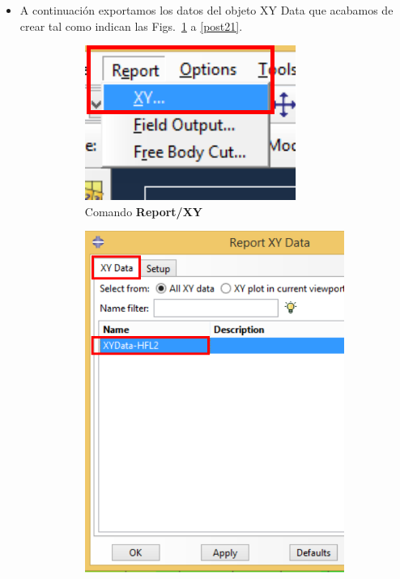 \begin{itemize}
\item A continuación exportamos los datos del objeto XY Data que
  acabamos de crear tal como indican las Figs.~\ref{post19} a
  \ref{post21}.
  \begin{figure}[!h]
    \centering
    \begin{subfigure}[!h]{0.25\textwidth}
      \includegraphics[width=\textwidth]{./body/images/post19.pdf}
      \caption{Comando \textbf{Report/XY}}
      \label{post19}
    \end{subfigure}%
    \begin{subfigure}[!h]{0.37\textwidth}
      \includegraphics[width=\textwidth]{./body/images/post20.pdf}

\end{subfigure}
\end{figure}
\end{itemize}
